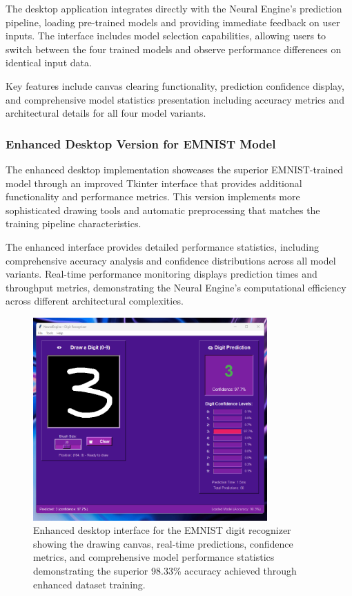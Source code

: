 \documentclass[11pt,a4paper]{report}
\begin{document}
The desktop application integrates directly with the Neural Engine's prediction pipeline, loading pre-trained models and providing immediate feedback on user inputs. The interface includes model selection capabilities, allowing users to switch between the four trained models and observe performance differences on identical input data.

Key features include canvas clearing functionality, prediction confidence display, and comprehensive model statistics presentation including accuracy metrics and architectural details for all four model variants.

\subsubsection{Enhanced Desktop Version for EMNIST Model}

The enhanced desktop implementation showcases the superior EMNIST-trained model through an improved Tkinter interface that provides additional functionality and performance metrics. This version implements more sophisticated drawing tools and automatic preprocessing that matches the training pipeline characteristics.

The enhanced interface provides detailed performance statistics, including comprehensive accuracy analysis and confidence distributions across all model variants. Real-time performance monitoring displays prediction times and throughput metrics, demonstrating the Neural Engine's computational efficiency across different architectural complexities.

\begin{figure}[H]
\centering
\includegraphics[width=0.8\textwidth]{digit_recognizer_desktop_interface.png}
\caption{Enhanced desktop interface for the EMNIST digit recognizer showing the drawing canvas, real-time predictions, confidence metrics, and comprehensive model performance statistics demonstrating the superior 98.33\% accuracy achieved through enhanced dataset training.}
\label{fig:digit_desktop}
\end{figure}
\end{document}
